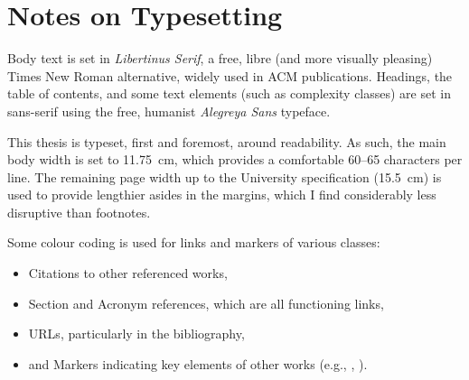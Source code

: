 \chapter*{Notes on Typesetting}

Body text is set in \emph{Libertinus Serif}, a free, libre (and more visually pleasing) Times New Roman alternative, widely used in ACM publications.
Headings, the table of contents, and some text elements (such as complexity classes) are set in sans-serif using the free, humanist \emph{Alegreya Sans} typeface.

This thesis is typeset, first and foremost, around readability.
As such, the main body width is set to \qty{11.75}{\centi\metre}, which provides a comfortable \numrange{60}{65} characters per line.
The remaining page width up to the University specification (\qty{15.5}{\centi\metre}) is used to provide lengthier asides in the margins, which I find considerably less disruptive than footnotes.

Some colour coding is used for links and markers of various classes:
\begin{itemize}
	\item {\color{uofgrust}Citations} to other referenced works,
	\item {\color{darkslate}Section and Acronym} references, which are all functioning links,
	\item {\color{uofgthistle}URLs}, particularly in the bibliography,
	\item and {\color{uofgforest}Markers} indicating key elements of other works (e.g., \rllitstate, \rllitact).
\end{itemize}